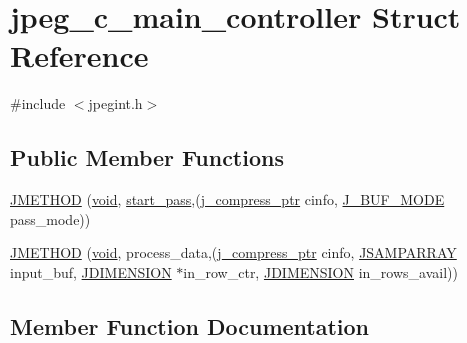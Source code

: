 \hypertarget{structjpeg__c__main__controller}{}\section{jpeg\+\_\+c\+\_\+main\+\_\+controller Struct Reference}
\label{structjpeg__c__main__controller}


{\ttfamily \#include $<$jpegint.\+h$>$}

\subsection*{Public Member Functions}
\begin{DoxyCompactItemize}
\item 
\hyperlink{structjpeg__c__main__controller_a12d7c719a1598e04dafbddc0c3d6c1d5}{J\+M\+E\+T\+H\+O\+D} (\hyperlink{png_8h_aa8c59027f9ab2769342f248709d68d17}{void}, \hyperlink{jddctmgr_8c_a1964f006adb8fb80f57e455f6452aec1}{start\+\_\+pass},(\hyperlink{jpeglib_8h_add2a072c54e3a51550f4975f7ddb91e7}{j\+\_\+compress\+\_\+ptr} cinfo, \hyperlink{jpegint_8h_a1f0803342372ac62b6903c399399c874}{J\+\_\+\+B\+U\+F\+\_\+\+M\+O\+D\+E} pass\+\_\+mode))
\item 
\hyperlink{structjpeg__c__main__controller_aefb0f62e18af1d6087803ac65bfd9bb9}{J\+M\+E\+T\+H\+O\+D} (\hyperlink{png_8h_aa8c59027f9ab2769342f248709d68d17}{void}, process\+\_\+data,(\hyperlink{jpeglib_8h_add2a072c54e3a51550f4975f7ddb91e7}{j\+\_\+compress\+\_\+ptr} cinfo, \hyperlink{jpeglib_8h_ac9d5d1b829ed51769db69a37271a7e91}{J\+S\+A\+M\+P\+A\+R\+R\+A\+Y} input\+\_\+buf, \hyperlink{jmorecfg_8h_a04ed4674f6f1d0d50ec241531e38274f}{J\+D\+I\+M\+E\+N\+S\+I\+O\+N} $\ast$in\+\_\+row\+\_\+ctr, \hyperlink{jmorecfg_8h_a04ed4674f6f1d0d50ec241531e38274f}{J\+D\+I\+M\+E\+N\+S\+I\+O\+N} in\+\_\+rows\+\_\+avail))
\end{DoxyCompactItemize}


\subsection{Member Function Documentation}
\hypertarget{structjpeg__c__main__controller_a12d7c719a1598e04dafbddc0c3d6c1d5}{}
